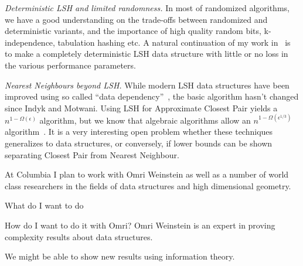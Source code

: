 \documentclass[10pt]{article}
\begin{document}
\emph{Deterministic LSH and limited randomness.} In most of randomized algorithms, we have a good understanding on the trade-offs between randomized and deterministic variants, and the importance of high quality random bits, k-independence, tabulation hashing etc.
A natural continuation of my work in~\cite{ahle2017optimal} is to make a completely deterministic LSH data structure with little or no loss in the various performance parameters.


\emph{Nearest Neighbours beyond LSH.}
While modern LSH data structures have been improved using so called ``data dependency''~\cite{DBLP:journals/corr/AndoniR15, DBLP:conf/stoc/AndoniNNRW18}, the basic algorithm hasn’t changed since Indyk and Motwani.
Using LSH for Approximate Closest Pair yields a $n^{1-\Omega(\epsilon)}$ algorithm, but we know that algebraic algorithms allow an $n^{1-\Omega(\epsilon^{1/3})}$ algorithm~\cite{DBLP:journals/corr/AlmanCW16}.
It is a very interesting open problem whether these techniques generalizes to data structures, or conversely, if lower bounds can be shown separating Closest Pair from Nearest Neighbour.





At Columbia I plan to work with Omri Weinstein as well as a number of world class researchers in the fields of data structures and high dimensional geometry.


What do I want to do

How do I want to do it with Omri?
Omri Weinstein is an expert in proving complexity results about data structures.

We might be able to show new results using information theory.







\end{document}
